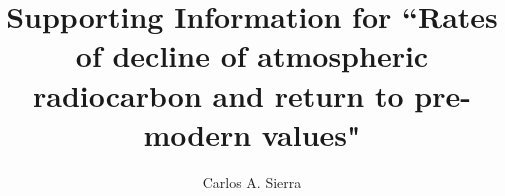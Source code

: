 \documentclass[draft,grl]{agutexSI}
\begin{document}
%
%



\title{Supporting Information for ``Rates of decline of atmospheric radiocarbon and return to pre-modern values"}
%
%

%
%


\author{Carlos A. Sierra}










%
%

%
\end{document}
